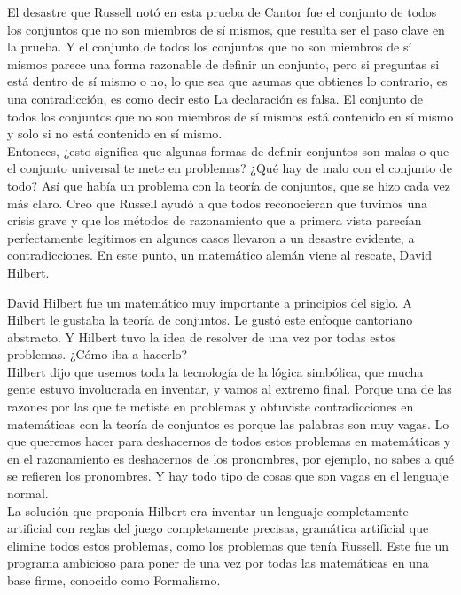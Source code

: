 \documentclass{article}
\begin{document}
\vspace{2mm}

El desastre que Russell notó en esta prueba de Cantor fue el conjunto de todos los conjuntos que no son miembros de sí mismos, que resulta ser el paso clave en la prueba. Y el conjunto de todos los conjuntos que no son miembros de sí mismos parece una forma razonable de definir un conjunto, pero si preguntas si está dentro de sí mismo o no, lo que sea que asumas que obtienes lo contrario, es una contradicción, es como decir esto La declaración es falsa. El conjunto de todos los conjuntos que no son miembros de sí mismos está contenido en sí mismo y solo si no está contenido en sí mismo. \\
Entonces, ¿esto significa que algunas formas de definir conjuntos son malas o que el conjunto universal te mete en problemas? ¿Qué hay de malo con el conjunto de todo? Así que había un problema con la teoría de conjuntos, que se hizo cada vez más claro. Creo que Russell ayudó a que todos reconocieran que tuvimos una crisis grave y que los métodos de razonamiento que a primera vista parecían perfectamente legítimos en algunos casos llevaron a un desastre evidente, a contradicciones. En este punto, un matemático alemán viene al rescate, David Hilbert.

\vspace{2mm}

David Hilbert fue un matemático muy importante a principios del siglo. A Hilbert le gustaba la teoría de conjuntos. Le gustó este enfoque cantoriano abstracto. Y Hilbert tuvo la idea de resolver de una vez por todas estos problemas. ¿Cómo iba a hacerlo?\\
Hilbert dijo que usemos toda la tecnología de la lógica simbólica, que mucha gente estuvo involucrada en inventar, y vamos al extremo final. Porque una de las razones por las que te metiste en problemas y obtuviste contradicciones en matemáticas con la teoría de conjuntos es porque las palabras son muy vagas. Lo que queremos hacer para deshacernos de todos estos problemas en matemáticas y en el razonamiento es deshacernos de los pronombres, por ejemplo, no sabes a qué se refieren los pronombres. Y hay todo tipo de cosas que son vagas en el lenguaje normal. \\
La solución que proponía Hilbert era inventar un lenguaje completamente artificial con reglas del juego completamente precisas, gramática artificial que elimine todos estos problemas, como los problemas que tenía Russell. Este fue un programa ambicioso para poner de una vez por todas las matemáticas en una base firme, conocido como Formalismo.
\end{document}
